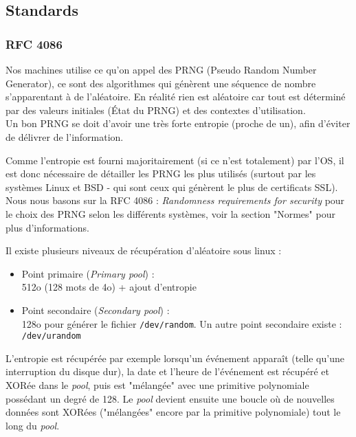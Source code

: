 \subsection{Standards}
	\subsubsection{RFC 4086}

			Nos machines utilise ce qu'on appel des PRNG (Pseudo Random Number
			Generator), ce sont des algorithmes qui génèrent une 
			séquence de nombre s'apparentant à de l'aléatoire.
			En réalité rien est aléatoire car tout est déterminé par
			des valeurs initiales (État du PRNG) et des contextes 
			d'utilisation.\\
			
			Un bon PRNG se doit d'avoir une très forte entropie (proche de un),
			afin d'éviter de délivrer de l'information.
		
			Comme l'entropie est fourni majoritairement (si ce n'est totalement)
			par l'OS, il est donc nécessaire de détailler les PRNG les plus
			utilisés (surtout par les systèmes Linux et BSD - qui sont 
			ceux qui génèrent le plus de certificats SSL).\\
		
			Nous nous basons sur la RFC 4086 \cite{rfc4086}: 
			\textit{Randomness requirements for security}
			pour le choix des PRNG selon les différents	systèmes, voir
			la section "Normes" pour plus d'informations.	
	
		
			Il existe plusieurs niveaux de récupération d'aléatoire sous linux  :
			\begin{itemize}
			\item Point primaire (\textit{Primary pool}) :\\
			512o (128 mots de 4o) + ajout d’entropie
			\item Point secondaire (\textit{Secondary pool}) :\\
			128o pour générer le fichier \texttt{/dev/random}. 
			Un autre point secondaire existe : \texttt{/dev/urandom}\\
			\end{itemize}
			
			L'entropie est récupérée par exemple lorsqu'un événement apparaît 
			(telle qu'une interruption du disque dur), la date et l'heure de 
			l'événement est récupéré et XORée dans le \textit{pool}, puis est 
			"mélangée" avec une primitive polynomiale possédant un degré de 128. 
			Le \textit{pool} devient ensuite une boucle où de nouvelles données 
			sont XORées ("mélangées" encore par la primitive polynomiale) tout 
			le long du \textit{pool}.\\
			
